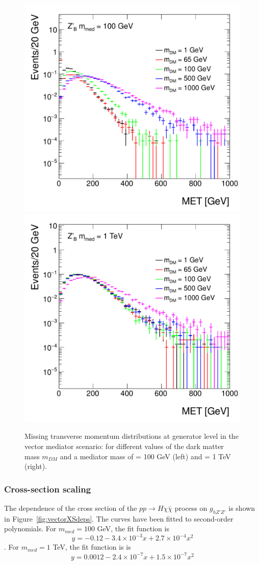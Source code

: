 \begin{figure}[hbpt!]
	\includegraphics[width=0.49\linewidth]{figures/EW/monoH/zprime_100_MET_et_Log}
	\includegraphics[width=0.49\linewidth]{figures/EW/monoH/zprime_1000_MET_et_Log}
	\caption{Missing transverse momentum distributions at generator level in the vector 
		mediator scenario: for different values of the dark matter mass $m_{DM}$ 
		and a mediator mass of \mmed = 100 GeV (left) and \mmed = 1 TeV (right).
		\label{fig:metVectorMass} }
\end{figure}

\subsubsection{Cross-section scaling}

The dependence of the cross section of the $pp \rightarrow H\chi\bar{\chi}$ process 
on $g_{hZ'Z'}$ is shown in Figure~\ref{fig:vectorXSdeps}. 
The curves have been fitted to second-order polynomials. 
For $m_{med} = 100$ GeV, the fit function is 
$$y = -0.12 - 3.4\times10^{-3}x + 2.7\times10^{-4}x^2$$.
For $m_{med} = 1$ TeV, the fit function is 
is $$y = 0.0012 - 2.4\times10^{-7}x + 1.5\times10^{-7}x^2$$

